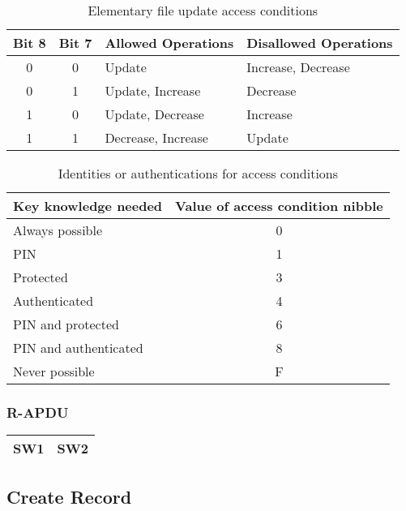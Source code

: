 \documentclass[a4paper,oneside]{article}
\begin{document}
\begin{table}[h!]
\caption{Elementary file update access conditions}
\begin{center}
\begin{tabular}{|c|c|l|l|} \hline
Bit 8 & Bit 7 & Allowed Operations & Disallowed Operations \\ \hline \hline
0 & 0 & Update & Increase, Decrease \\ \hline
0 & 1 & Update, Increase & Decrease \\ \hline
1 & 0 & Update, Decrease & Increase \\ \hline
1 & 1 & Decrease, Increase & Update \\ \hline
\end{tabular}
\end{center}
\end{table}

\begin{table}[h!]
\caption{Identities or authentications for access conditions}
\begin{center}
\begin{tabular}{|l|c|} \hline
Key knowledge needed & Value of access condition nibble \\ \hline \hline
Always possible & 0 \\ \hline
PIN & 1 \\ \hline
Protected & 3 \\ \hline
Authenticated & 4 \\ \hline
PIN and protected & 6 \\ \hline
PIN and authenticated & 8 \\ \hline
Never possible & F \\ \hline
\end{tabular}
\end{center}
\end{table}

\subsubsection*{R-APDU}

\begin{tabular}{|c|c|} \hline
SW1 & SW2 \\ \hline
\end{tabular}


\subsection{Create Record}
\end{document}
